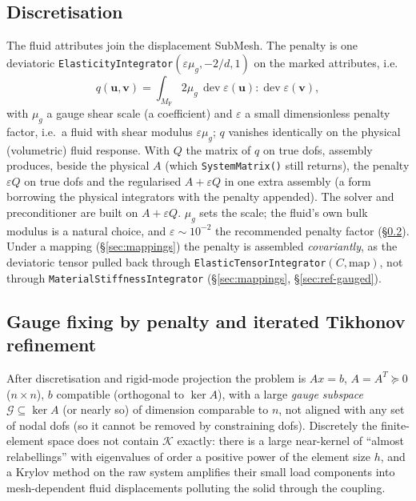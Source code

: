 \documentclass[11pt]{article}
\numberwithin{equation}{section}
\theoremstyle{remark}
\newcommand{\eps}{\varepsilon}
\newcommand{\dev}{\operatorname{dev}}
\newcommand{\vu}{\mathbf{u}}
\newcommand{\vv}{\mathbf{v}}
\newcommand{\MF}{M_{\mathrm{F}}}
\newcommand{\code}[1]{\texttt{#1}}
\begin{document}
\subsection{Discretisation}

The fluid attributes join the displacement SubMesh. The penalty is one
deviatoric \code{ElasticityIntegrator}$(\eps\mu_g, -2/d, 1)$ on the marked
attributes, i.e.\
\begin{equation}
  q(\vu,\vv) = \int_{\MF} 2\mu_g\,\dev\eps(\vu):\dev\eps(\vv),
\end{equation}
with $\mu_g$ a gauge shear scale (a coefficient) and $\eps$ a small
dimensionless penalty factor, i.e.\ a fluid with shear modulus $\eps\mu_g$;
$q$ vanishes identically on the physical (volumetric) fluid response.
With $Q$ the matrix of $q$ on true dofs, assembly produces, beside the physical $A$ (which \code{SystemMatrix()}
still returns), the penalty $\eps Q$ on true dofs and the regularised
$A + \eps Q$ in one extra assembly (a form borrowing the physical
integrators with the penalty appended). The solver and preconditioner are
built on $A+\eps Q$. $\mu_g$ sets the scale; the fluid's own bulk modulus
is a natural choice, and $\eps\sim10^{-2}$ the recommended penalty factor
(\S\ref{sec:tikhonov}). Under a mapping (\S\ref{sec:mappings}) the
penalty is assembled \emph{covariantly}, as the deviatoric tensor pulled
back through \code{ElasticTensorIntegrator}$(C,\text{map})$, not through
\code{MaterialStiffnessIntegrator} (\S\ref{sec:mappings},
\S\ref{sec:ref-gauged}).

\subsection{Gauge fixing by penalty and iterated Tikhonov refinement}
\label{sec:tikhonov}

After discretisation and rigid-mode projection the problem is $Ax = b$,
$A = A^T\succeq0$ ($n\times n$), $b$ compatible (orthogonal to $\ker A$),
with a large \emph{gauge subspace} $\mathcal{G}\subseteq\ker A$ (or nearly
so) of dimension comparable to $n$, not aligned with any set of nodal dofs
(so it cannot be removed by constraining dofs). Discretely the
finite-element space does not contain $\mathcal{K}$ exactly: there is a
large near-kernel of ``almost relabellings'' with eigenvalues of order a
positive power of the element size $h$, and a Krylov method on the raw
system amplifies their small load components into mesh-dependent fluid
displacements polluting the solid through the coupling.
\end{document}
